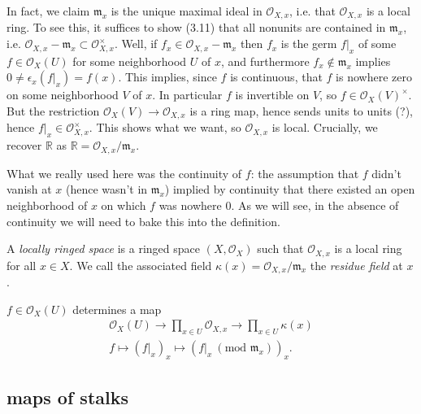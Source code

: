 \documentclass[12pt]{article}
\begin{document}
\begin{example}
	In fact, we claim $\mathfrak{m}_x$ is the unique maximal ideal in $\mathcal{O}_{X,x}$, i.e. that $\mathcal{O}_{X,x}$ is a local ring. To see this, it suffices to show (3.11) that all nonunits are contained in $\mathfrak{m}_x$, i.e. $\mathcal{O}_{X,x}-\mathfrak{m}_x\subset\mathcal{O}_{X,x}^\times$. Well, if $f_x\in\mathcal{O}_{X,x}-\mathfrak{m}_x$ then $f_x$ is the germ $f|_x$ of some $f\in\mathcal{O}_X(U)$ for some neighborhood $U$ of $x$, and furthermore $f_x\not\in \mathfrak{m}_x$ implies $0\neq\epsilon_x(f|_x)=f(x)$. This implies, since $f$ is continuous, that $f$ is nowhere zero on some neighborhood $V$ of $x$. In particular $f$ is invertible on $V$, so $f\in\mathcal{O}_X(V)^\times$. But the restriction $\mathcal{O}_X(V)\to\mathcal{O}_{X,x}$ is a ring map, hence sends units to units (?), hence $f|_x\in\mathcal{O}_{X,x}^\times$. This shows what we want, so $\mathcal{O}_{X,x}$ is local. Crucially, we recover $\mathbb{R}$ as $\mathbb{R}=\mathcal{O}_{X,x}/\mathfrak{m}_x$. 

	What we really used here was the continuity of $f$: the assumption that $f$ didn't vanish at $x$ (hence wasn't in $\mathfrak{m}_x$) implied by continuity that there existed an open neighborhood of $x$ on which $f$ was nowhere 0. As we will see, in the absence of continuity we will need to bake this into the definition.
\end{example}

\begin{definition}
	A \emph{locally ringed space} is a ringed space $(X,\mathcal{O}_X)$ such that $\mathcal{O}_{X,x}$ is a local ring for all $x\in X$. We call the associated field $\kappa(x)=\mathcal{O}_{X,x}/\mathfrak{m}_x$ the \emph{residue field} at $x$.
\end{definition}

\begin{remark}
	$f\in\mathcal{O}_X(U)$ determines a map 
	\begin{gather*}
		\mathcal{O}_X(U) \to \prod_{x\in U}\mathcal{O}_{X,x} \to \prod_{x\in U}\kappa(x) \\
		f \mapsto (f|_x)_x \mapsto (f|_x \ (\text{mod } \mathfrak{m}_x))_x.
	\end{gather*}
\end{remark}


\subsection{maps of stalks} %
\end{document}
